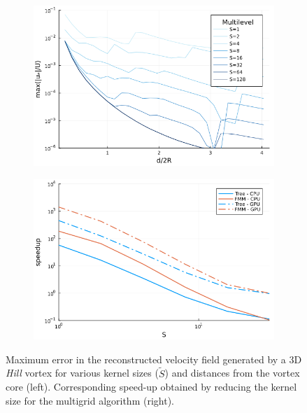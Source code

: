 \documentclass{article}
\begin{document}
\begin{figure}
    \centering
    \begin{subfigure}{.5\textwidth}
        \centering
        \includegraphics[width=\textwidth]{tex//fig/Hill_error_dists.png}
    \end{subfigure}%
    \begin{subfigure}{.5\textwidth}
        \centering
        \includegraphics[width=\textwidth]{tex/fig/Hill_speedup_dists.png}
    \end{subfigure}
    \caption{Maximum error in the reconstructed velocity field generated by a 3D \emph{Hill} vortex for various kernel sizes ($\tilde{S}$) and distances from the vortex core (left). Corresponding speed-up obtained by reducing the kernel size for the multigrid algorithm (right).}
    \label{fig:error_hill_3}
\end{figure}
\end{document}
